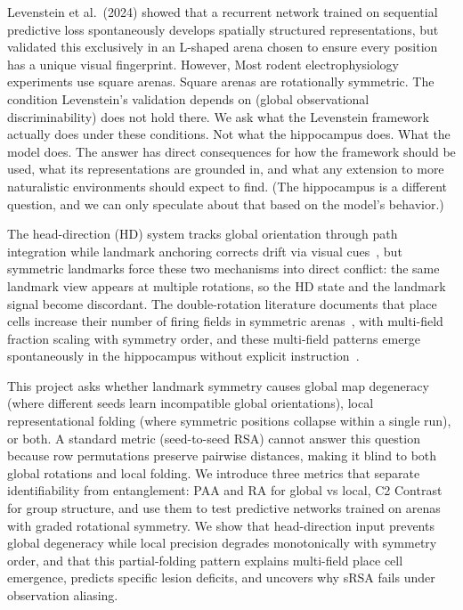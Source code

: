 ﻿\documentclass[11pt, a4paper]{article}
\begin{document}
Levenstein et al.~(2024) showed that a recurrent network trained on sequential predictive loss spontaneously develops spatially structured representations, but validated this exclusively in an L-shaped arena chosen to ensure every position has a unique visual fingerprint. However, Most rodent electrophysiology experiments use square arenas. Square arenas are rotationally symmetric. The condition Levenstein's validation depends on (global observational discriminability) does not hold there. We ask what the Levenstein framework actually does under these conditions. Not what the hippocampus does. What the model does. The answer has direct consequences for how the framework should be used, what its representations are grounded in, and what any extension to more naturalistic environments should expect to find. (The hippocampus is a different question, and we can only speculate about that based on the model's behavior.)

The head-direction (HD) system tracks global orientation through path integration while landmark anchoring corrects drift via visual cues~\cite{taube1990, knierim1995}, but symmetric landmarks force these two mechanisms into direct conflict: the same landmark view appears at multiple rotations, so the HD state and the landmark signal become discordant. The double-rotation literature documents that place cells increase their number of firing fields in symmetric arenas~\cite{muller1987, knierim1995}, with multi-field fraction scaling with symmetry order, and these multi-field patterns emerge spontaneously in the hippocampus without explicit instruction~\cite{leutgeb2005}.

This project asks whether landmark symmetry causes global map degeneracy (where different seeds learn incompatible global orientations), local representational folding (where symmetric positions collapse within a single run), or both. A standard metric (seed-to-seed RSA) cannot answer this question because row permutations preserve pairwise distances, making it blind to both global rotations and local folding. We introduce three metrics that separate identifiability from entanglement: PAA and RA for global vs local, C2 Contrast for group structure, and use them to test predictive networks trained on arenas with graded rotational symmetry. We show that head-direction input prevents global degeneracy while local precision degrades monotonically with symmetry order, and that this partial-folding pattern explains multi-field place cell emergence, predicts specific lesion deficits, and uncovers why sRSA fails under observation aliasing.
\end{document}
